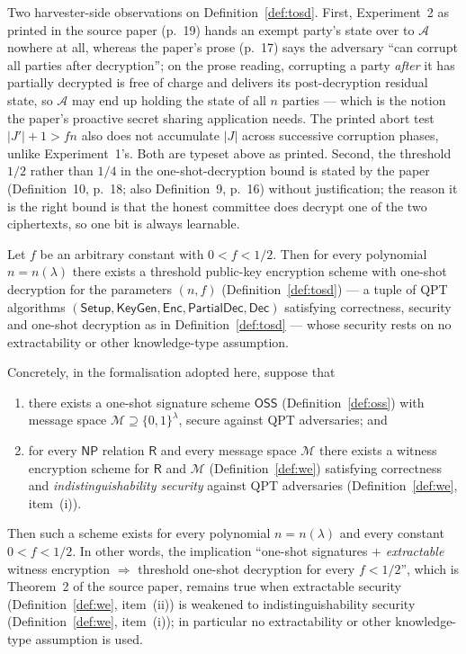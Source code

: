 \documentclass{aicr-conjecture}
\newcommand{\NP}{\mathsf{NP}}
\newcommand{\Rel}{\mathsf{R}}
\newcommand{\Msp}{\mathcal{M}}
\newcommand{\Setup}{\mathsf{Setup}}
\newcommand{\KeyGen}{\mathsf{KeyGen}}
\newcommand{\Enc}{\mathsf{Enc}}
\newcommand{\Dec}{\mathsf{Dec}}
\newcommand{\PartialDec}{\mathsf{PartialDec}}
\newcommand{\OSS}{\mathsf{OSS}}
\begin{document}
\begin{remark}\label{rem:tosd}
Two harvester-side observations on Definition~\ref{def:tosd}. First,
Experiment~2 as printed in the source paper (p.~19) hands an exempt
party's state over to $\mathcal{A}$ nowhere at all, whereas the
paper's prose (p.~17) says the adversary ``can corrupt all parties
after decryption''; on the prose reading, corrupting a party
\emph{after} it has partially decrypted is free of charge and delivers
its post-decryption residual state, so $\mathcal{A}$ may end up
holding the state of all $n$ parties --- which is the notion the
paper's proactive secret sharing application needs. The printed abort
test $\lvert J' \rvert + 1 > f n$ also does not accumulate $\lvert J
\rvert$ across successive corruption phases, unlike Experiment~1's.
Both are typeset above as printed. Second, the threshold $1/2$ rather
than $1/4$ in the one-shot-decryption bound is stated by the paper
(Definition~10, p.~18; also Definition~9, p.~16) without
justification; the reason it is the right bound is that the honest
committee does decrypt one of the two ciphertexts, so one bit is
always learnable.
\end{remark}

\begin{conjecture}\label{conj:main}
Let $f$ be an arbitrary constant with $0 < f < 1/2$. Then for every
polynomial $n = n(\lambda)$ there exists a threshold public-key
encryption scheme with one-shot decryption for the parameters $(n, f)$
(Definition~\ref{def:tosd}) --- a tuple of QPT algorithms $(\Setup,
\KeyGen, \Enc, \PartialDec, \Dec)$ satisfying correctness, security
and one-shot decryption as in Definition~\ref{def:tosd} --- whose
security rests on no extractability or other knowledge-type
assumption.

Concretely, in the formalisation adopted here, suppose that
\begin{enumerate}[leftmargin=1.6em]
  \item[(i)] there exists a one-shot signature scheme $\OSS$
    (Definition~\ref{def:oss}) with message space $\Msp \supseteq
    \{0,1\}^{\lambda}$, secure against QPT adversaries; and
  \item[(ii)] for every $\NP$ relation $\Rel$ and every message space
    $\Msp$ there exists a witness encryption scheme for $\Rel$ and
    $\Msp$ (Definition~\ref{def:we}) satisfying correctness and
    \emph{indistinguishability security} against QPT adversaries
    (Definition~\ref{def:we}, item~(i)).
\end{enumerate}
Then such a scheme exists for every polynomial $n = n(\lambda)$ and
every constant $0 < f < 1/2$. In other words, the implication
``one-shot signatures $+$ \emph{extractable} witness encryption
$\Rightarrow$ threshold one-shot decryption for every $f < 1/2$'',
which is Theorem~2 of the source paper, remains true when extractable
security (Definition~\ref{def:we}, item~(ii)) is weakened to
indistinguishability security (Definition~\ref{def:we}, item~(i)); in
particular no extractability or other knowledge-type assumption is
used.
\end{conjecture}
\end{document}
